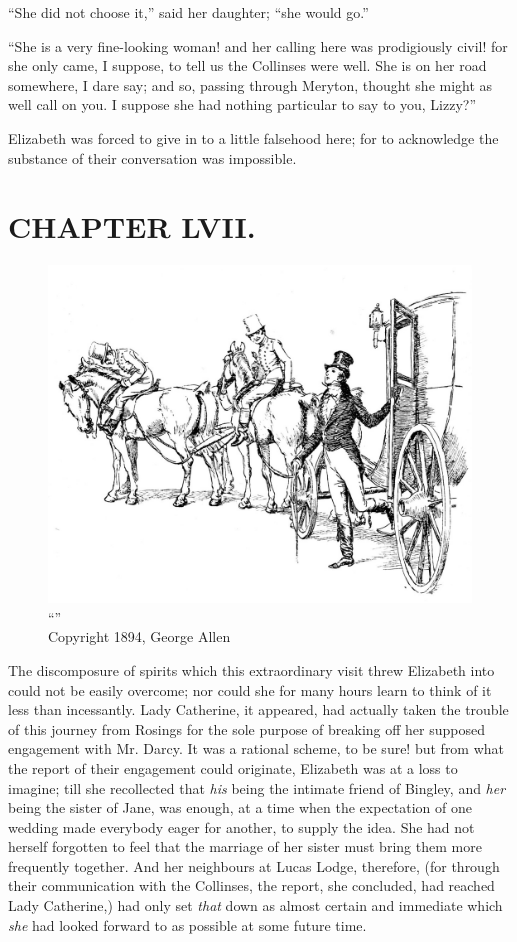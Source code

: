 ``She did not choose it,'' said her daughter; ``she would go.''

``She is a very fine-looking woman! and her calling here was prodigiously civil! for she only came, I suppose, to tell us the Collinses were well. She is on her road somewhere, I dare say; and so, passing through Meryton, thought she might as well call on you. I suppose she had nothing particular to say to you, Lizzy?''

Elizabeth was forced to give in to a little falsehood here; for to acknowledge the substance of their conversation was impossible.



\chapter{CHAPTER LVII.}

\begin{figure}[htbp]
    \centering
    \includegraphics[width=\textwidth]{illustrations/i_031.jpg}
    \caption{“”\\ Copyright 1894, George Allen}
    \label{fig:image}
\end{figure}


The discomposure of spirits which this extraordinary visit threw Elizabeth into could not be easily overcome; nor could she for many hours learn to think of it less than incessantly. Lady Catherine, it appeared, had actually taken the trouble of this journey from Rosings for the sole purpose of breaking off her supposed engagement with Mr. Darcy. It was a rational scheme, to be sure! but from what the report of their engagement could originate, Elizabeth was at a loss to imagine; till she recollected that \textit{his} being the intimate friend of Bingley, and \textit{her} being the sister of Jane, was enough, at a time when the expectation of one wedding made everybody eager for another, to supply the idea. She had not herself forgotten to feel that the marriage of her sister must bring them more frequently together. And her neighbours at Lucas Lodge, therefore, (for through their communication with the Collinses, the report, she concluded, had reached Lady Catherine,) had only set \textit{that} down as almost certain and immediate which \textit{she} had looked forward to as possible at some future time.

